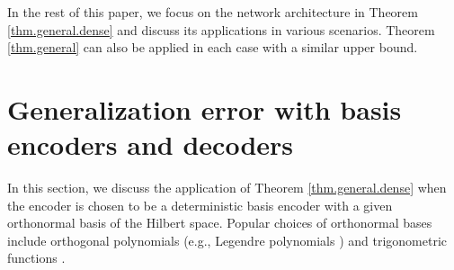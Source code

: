 \documentclass[11pt]{article} %
\begin{document}
In the rest of this paper, we focus on the network architecture in Theorem \ref{thm.general.dense} and discuss its applications in various scenarios. Theorem \ref{thm.general} can also be applied in each case with a similar upper bound.





\section{Generalization error with basis encoders and decoders} \label{sec.deter}
In this section, we discuss the application of Theorem \ref{thm.general.dense} when the encoder is chosen to be a deterministic basis encoder with a given orthonormal basis of the Hilbert space. Popular choices of orthonormal bases include orthogonal polynomials (e.g., Legendre polynomials \citep{szeg1939orthogonal,chkifa2015breaking,cohen2015approximation}) and trigonometric functions \citep{orszag1971accurate,chen1998applications,li2016characterizing}.  %
\end{document}
